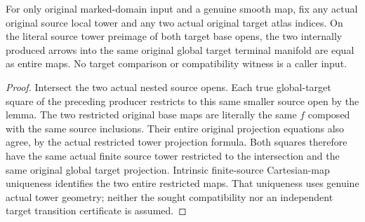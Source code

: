 \begin{theorem}
\label{hir:original-local-smooth-global-arrow-target-chart-compatibility}
\leanok
{}
For only original marked-domain input and a genuine smooth map, fix any
actual original source local tower and any two actual original target
atlas indices. On the literal source tower preimage of both target base
opens, the two internally produced arrows into the same original global
target terminal manifold are equal as entire maps. No target comparison
or compatibility witness is a caller input.
\end{theorem}
\begin{proof}
Intersect the two actual nested source opens. Each true global-target
square of the preceding producer restricts to this same smaller source
open by the lemma. The two restricted original base maps are literally
the same $f$ composed with the same source inclusions. Their entire
original projection equations also agree, by the actual restricted tower
projection formula. Both squares therefore have the same actual finite
source tower restricted to the intersection and the same original global
target projection. Intrinsic finite-source Cartesian-map uniqueness
identifies the two entire restricted maps. That uniqueness uses genuine
actual tower geometry; neither the sought compatibility nor an independent
target transition certificate is assumed.
\end{proof}
